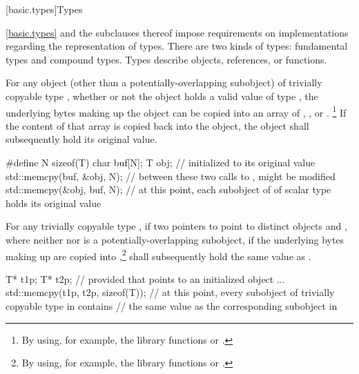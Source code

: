 [basic.types]{Types}%

\pnum
\begin{note}
\ref{basic.types} and the subclauses thereof
impose requirements on implementations regarding the representation
of types.
There are two kinds of types: fundamental types and compound types.
Types describe objects,
references,
or functions.
\end{note}

\pnum
{}%
%
For any object (other than a potentially-overlapping subobject) of trivially copyable type
, whether or not the object holds a valid value of type
, the underlying bytes making up the
object can be copied into an array of
,
, or
.%
\footnote{By using, for example, the library
functions  or .}
If the content of that array
is copied back into the object, the object shall
subsequently hold its original value. \begin{example}
\begin{codeblock}
#define N sizeof(T)
char buf[N];
T obj;                          //  initialized to its original value
std::memcpy(buf, &obj, N);      // between these two calls to ,  might be modified
std::memcpy(&obj, buf, N);      // at this point, each subobject of  of scalar type holds its original value
\end{codeblock}
\end{example}

\pnum
For any trivially copyable type , if two pointers to  point to
distinct  objects  and , where neither
 nor  is a potentially-overlapping subobject, if the underlying
bytes making up
 are copied into ,\footnote{By using, for example,
the library functions  or .}
  shall subsequently hold the same value as
. \begin{example}

\begin{codeblock}
T* t1p;
T* t2p;
    // provided that  points to an initialized object ...
std::memcpy(t1p, t2p, sizeof(T));
    // at this point, every subobject of trivially copyable type in  contains
    // the same value as the corresponding subobject in 
\end{codeblock}
\end{example}%

